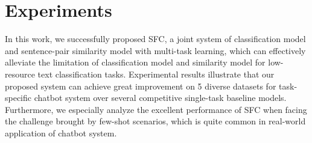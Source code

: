 \section{Experiments}
\label{sec:conclusion}

In  this  work,  we  successfully proposed SFC, a joint system of classification
model  and  sentence-pair  similarity  model with multi-task learning, which can
effectively  alleviate  the  limitation  of  classification model and similarity
model   for  low-  resource  text  classification  tasks.  Experimental  results
illustrate  that  our proposed system can achieve great improvement on 5 diverse
datasets  for  task-specific chatbot system over several competitive single-task
baseline models. Furthermore, we especially analyze the excellent performance of
SFC  when  facing  the  challenge  brought by few-shot scenarios, which is quite
common in real-world application of chatbot system.
